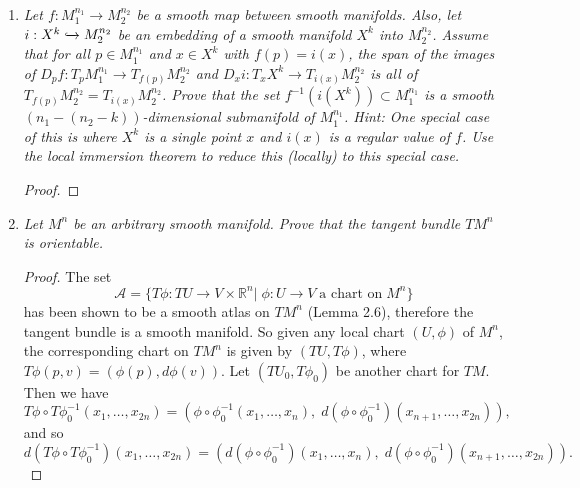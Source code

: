 \documentclass{article}
\begin{document}
\begin{enumerate}[label={\bf Q\arabic*:}]
\begin{proof}
    \end{proof}

  \item \it Let $f:M_1^{n_1}\rightarrow M_2^{n_2}$ be a smooth map between
    smooth manifolds. Also, let $i:X^k\xhookrightarrow{}M_2^{n_2}$ be an
    embedding of a smooth manifold $X^k$ into $M_2^{n_2}$. Assume that for
    all $p\in M_1^{n_1}$ and $x\in X^k$ with $f(p)=i(x)$, the span of the
    images of $D_pf:T_pM_1^{n_1}\rightarrow T_{f(p)}M_2^{n_2}$ and
    $D_xi:T_xX^k\rightarrow T_{i(x)}M_2^{n_2}$ is all of
    $T_{f(p)}M_2^{n_2}=T_{i(x)}M_2^{n_2}$. Prove that the set
    $f^{-1}(i(X^k))\subset M_1^{n_1}$ is a smooth
    $(n_1-(n_2-k))$-dimensional submanifold of $M_1^{n_1}$. Hint: One
    special case of this is where $X^k$ is a single point $x$ and $i(x)$ is
    a regular value of $f$. Use the local immersion theorem to reduce this
    (locally) to this special case.

    \begin{proof}
    \end{proof}

  \item \it Let $M^n$ be an arbitrary smooth manifold. Prove that the tangent
    bundle $TM^n$ is orientable.

    \begin{proof}
      The set 
      \[\mathcal{A} = \{T\phi:TU\rightarrow V\times\mathbb{R}^n|\;
        \phi:U\rightarrow V\; \text{a chart on}\; M^n\}\]
      has been shown to be a smooth atlas on $TM^n$ (Lemma 2.6), therefore
      the tangent bundle is a smooth manifold. So given any local chart
      $(U,\phi)$ of $M^n$, the corresponding chart on $TM^n$ is given by
      $(TU,T\phi)$, where $T\phi(p,v)=(\phi(p),d\phi(v))$. Let
      $(TU_0,T\phi_0)$ be another chart for $TM$. Then we have
      \[T\phi\circ T\phi_0^{-1}(x_1,\ldots,x_{2n})
        =(\phi\circ\phi_0^{-1}(x_1,\ldots,x_n),\; d(\phi\circ\phi_0^{-1})
        (x_{n+1},\ldots,x_{2n})),\]
      and so
      \[d(T\phi\circ T\phi_0^{-1})(x_{1},\ldots,x_{2n})
        =(d(\phi\circ\phi_0^{-1})(x_{1},\ldots,x_{n}),\;
        d(\phi\circ\phi_0^{-1})(x_{n+1},\ldots,x_{2n})).\]


\end{proof}
\end{enumerate}
\end{document}
